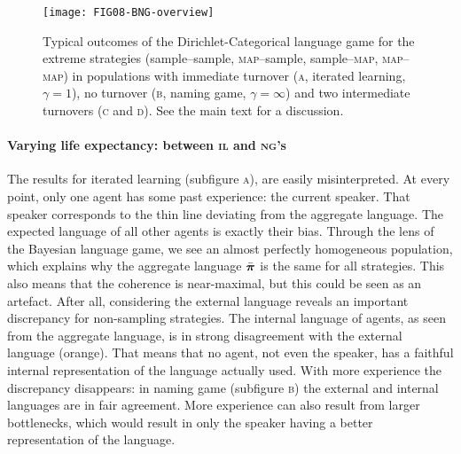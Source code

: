 \documentclass{../src/bcthesispart}
\begin{document}
\begin{SCfigure}
	\texttt{[image: FIG08-BNG-overview]}
	
	\caption{%
	Typical outcomes of the Dirichlet-Categorical language game for the extreme strategies 
	(sample--sample, \textsc{map}--sample, sample--\textsc{map}, \textsc{map--map}) in populations with 
	immediate turnover (\textsc{a}, iterated learning, $\gamma=1$), 
	no turnover (\textsc{b}, naming game, $\gamma=\infty$) 
	and two intermediate turnovers (\textsc{c} and \textsc{d}).
	See the main text for a discussion.
	\label{fig:FIG08-bng-overview}}
\end{SCfigure}




\paragraph{Varying life expectancy: between \textsc{il} and \textsc{ng}’s}

The results for iterated learning (subfigure \textsc{a}), are easily misinterpreted.
At every point, only one agent has some past experience: the current speaker.
That speaker corresponds to the thin line deviating from the aggregate language.
The expected language of all other agents is exactly their bias.
Through the lens of the Bayesian language game, we see an almost perfectly homogeneous population, which explains why the aggregate language $\bar{\boldsymbol{\mathbf{\pi}}}$ is the same for all strategies.
This also means that the coherence is near-maximal, but this could be seen as an artefact.
After all, considering the external language reveals an important discrepancy for non-sampling strategies.
The internal language of agents, as seen from the aggregate language, is in strong disagreement with the external language (orange).
That means that no agent, not even the speaker, has a faithful internal representation of the language actually used.
With more experience the discrepancy disappears: in naming game (subfigure \textsc{b}) the external and internal languages are in fair agreement.
More experience can also result from larger bottlenecks, which would result in  only the speaker having a better representation of the language.
\end{document}
